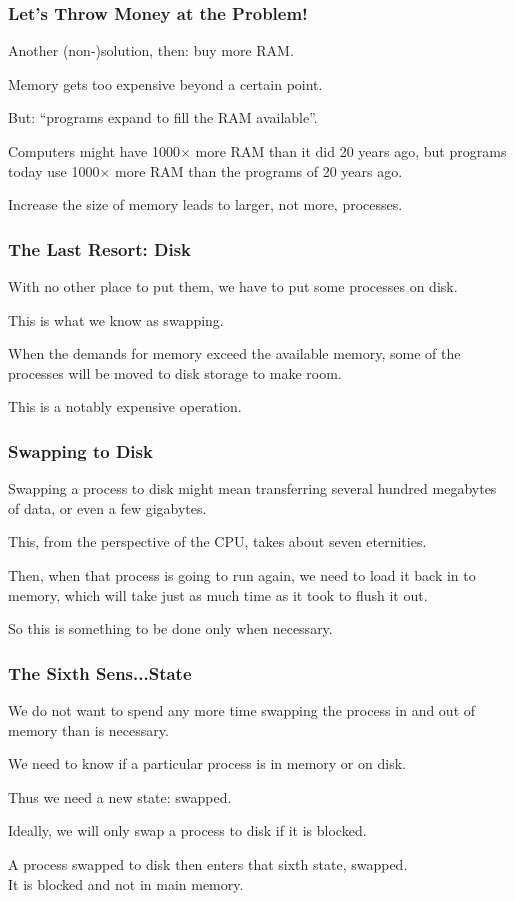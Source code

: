 \begin{frame}
\frametitle{Let's Throw Money at the Problem!}

Another (non-)solution, then: buy more RAM. 

Memory gets too expensive beyond a certain point.

But: ``programs expand to fill the RAM available''.

Computers might have 1000$\times$ more RAM than it did 20 years ago, but programs today use 1000$\times$ more RAM than the programs of 20 years ago. 

Increase the size of memory leads to larger, not more, processes.

\end{frame}

\begin{frame}
\frametitle{The Last Resort: Disk}

With no other place to put them, we have to put some processes on disk.

This is what we know as \alert{swapping}.

When the demands for memory exceed the available memory, some of the processes will be moved to disk storage to make room. 

This is a notably expensive operation.
\end{frame}

\begin{frame}
\frametitle{Swapping to Disk}

Swapping a process to disk might mean transferring several hundred megabytes of data, or even a few gigabytes. 

This, from the perspective of the CPU, takes about seven eternities. 

Then, when that process is going to run again, we need to load it back in to memory, which will take just as much time as it took to flush it out. 

So this is something to be done only when necessary.

\end{frame}

\begin{frame}
\frametitle{The Sixth Sens...State}

We do not want to spend any more time swapping the process in and out of memory than is necessary.

 We need to know if a particular process is in memory or on disk.
 
Thus we need a new state: swapped.  

Ideally, we will only swap a process to disk if it is blocked. 

A process swapped to disk then enters that sixth state, swapped.\\
\quad It is blocked and not in main memory.

\end{frame}

